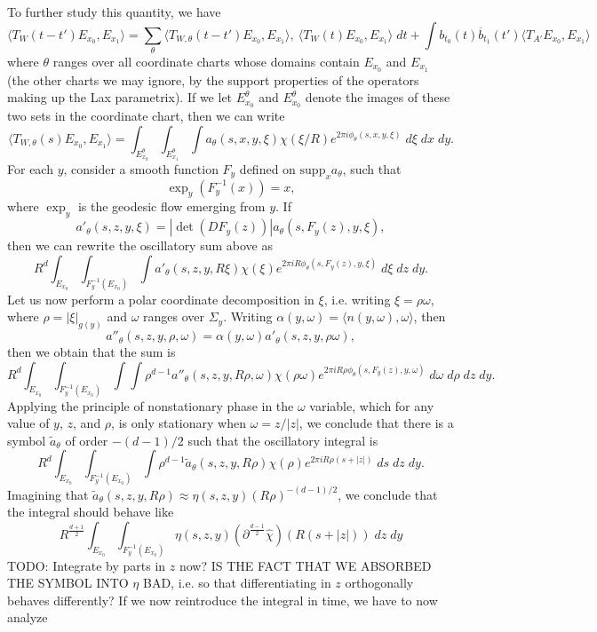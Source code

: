 To further study this quantity, we have
%
\[ \langle T_W(t-t') E_{x_0}, E_{x_1} \rangle = \sum_\theta \langle T_{W,\theta}(t-t') E_{x_0}, E_{x_1} \rangle, \ \langle T_W(t) E_{x_0}, E_{x_1} \rangle\; dt + \int b_{t_0}(t) \overline{b}_{t_1}(t') \langle T_{A'} E_{x_0}, E_{x_1} \rangle \]
%
where $\theta$ ranges over all coordinate charts whose domains contain $E_{x_0}$ and $E_{x_1}$ (the other charts we may ignore, by the support properties of the operators making up the Lax parametrix).  If we let $E_{x_0}^\theta$ and $E_{x_0}^\theta$ denote the images of these two sets in the coordinate chart, then we can write
%
\[ \langle T_{W,\theta}(s) E_{x_0}, E_{x_1} \rangle = \int_{E_{x_0}^\theta} \int_{E_{x_1}^\theta} \int a_\theta(s,x,y,\xi) \chi(\xi / R) e^{2 \pi i \phi_\theta(s,x,y,\xi)}\; d\xi\; dx\; dy. \]
%
For each $y$, consider a smooth function $F_y$ defined on $\text{supp}_x a_\theta$, such that
%
\[ \exp_y(F_y^{-1}(x)) = x, \]
%
where $\exp_y$ is the geodesic flow emerging from $y$. If
%
\[ a'_\theta(s,z,y,\xi) = |\det(DF_y(z))| a_\theta(s,F_y(z),y,\xi), \]
%
then we can rewrite the oscillatory sum above as
%
\[ R^d \int_{E_{x_0}} \int_{F_y^{-1}(E_{x_0})} \int a'_\theta(s,z,y,R \xi) \chi(\xi) e^{2 \pi i R \phi_\theta(s,F_y(z),y,\xi)}\; d\xi\; dz\; dy. \]
%
Let us now perform a polar coordinate decomposition in $\xi$, i.e. writing $\xi = \rho \omega$, where $\rho = |\xi|_{g(y)}$ and $\omega$ ranges over $\Sigma_y$. Writing $\alpha(y,\omega) = \langle n(y,\omega), \omega \rangle$, then
%
\[ a''_\theta(s,z,y,\rho,\omega) = \alpha(y,\omega) a'_\theta(s,z,y,\rho \omega), \]
%
then we obtain that the sum is
%
\[ R^d \int_{E_{x_0}} \int_{F_y^{-1}(E_{x_0})} \int \int \rho^{d-1} a''_\theta(s,z,y,R \rho, \omega) \chi(\rho \omega) e^{2 \pi i R \rho \phi_\theta(s,F_y(z),y,\omega)}\; d\omega\; d\rho\; dz\; dy. \]
%
Applying the principle of nonstationary phase in the $\omega$ variable, which for any value of $y$, $z$, and $\rho$, is only stationary when $\omega = z / |z|$, we conclude that there is a symbol $\tilde{a}_\theta$ of order $-(d-1)/2$ such that the oscillatory integral is
%
\[ R^d \int_{E_{x_0}} \int_{F_y^{-1}(E_{x_0})} \int \rho^{d-1} \tilde{a}_\theta(s,z,y,R \rho) \chi(\rho) e^{2 \pi i R \rho (s + |z|)}\; ds\; dz\; dy. \]
%
Imagining that $\tilde{a}_\theta(s,z,y, R \rho) \approx \eta(s,z,y) (R \rho)^{-(d-1)/2}$, we conclude that the integral should behave like
%
\[ R^{\frac{d+1}{2}} \int_{E_{x_0}} \int_{F_y^{-1}(E_{x_0})} \eta(s,z,y) (\partial^{\frac{d-1}{2}} \widehat{\chi})(R(s + |z|))\; dz\; dy \]
%
TODO: Integrate by parts in $z$ now? IS THE FACT THAT WE ABSORBED THE SYMBOL INTO $\eta$ BAD, i.e. so that differentiating in $z$ orthogonally behaves differently? If we now reintroduce the integral in time, we have to now analyze
